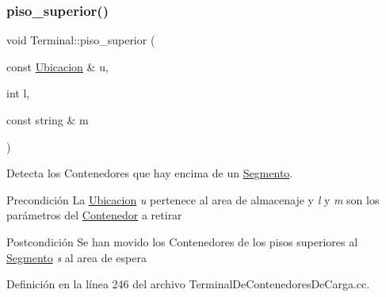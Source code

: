 \subsubsection{\texorpdfstring{piso\+\_\+superior()}{piso\_superior()}}
{\footnotesize\ttfamily void Terminal\+::piso\+\_\+superior (\begin{DoxyParamCaption}\item[{const \hyperlink{class_ubicacion}{Ubicacion} \&}]{u,  }\item[{int}]{l,  }\item[{const string \&}]{m }\end{DoxyParamCaption})}



Detecta los Contenedores que hay encima de un \hyperlink{class_segmento}{Segmento}. 

\begin{DoxyPrecond}{Precondición}
La \hyperlink{class_ubicacion}{Ubicacion} {\itshape u} pertenece al area de almacenaje y {\itshape l} y {\itshape m} son los parámetros del \hyperlink{class_contenedor}{Contenedor} a retirar 
\end{DoxyPrecond}
\begin{DoxyPostcond}{Postcondición}
Se han movido los Contenedores de los pisos superiores al \hyperlink{class_segmento}{Segmento} {\itshape s} al area de espera 
\end{DoxyPostcond}


Definición en la línea 246 del archivo Terminal\+De\+Contenedores\+De\+Carga.\+cc.


